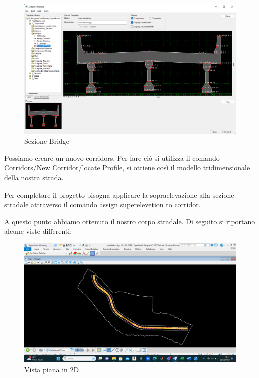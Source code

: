 \begin{figure}[H]
    \includegraphics[width=\textwidth]{Figures/Sezione Bridge.png}
      \caption{Sezione Bridge}
      \label{Sezione Bridge}
\end{figure}

Possiamo creare un nuovo corridors. Per fare ciò si utilizza il comando Corridors/New Corridor/locate Profile, si ottiene così il modello tridimensionale della nostra strada.

Per completare il progetto bisogna applicare la sopraelevazione alla sezione stradale attraverso il comando assign superelevetion to corridor.

A questo punto abbiamo ottenuto il nostro corpo stradale. Di seguito si riportano alcune viste differenti:

\begin{figure}[H]
    \includegraphics[width=\textwidth]{Figures/Vista piana in 2D.png}
      \caption{Vista piana in 2D}
      \label{Vista piana in 2D}
\end{figure}


